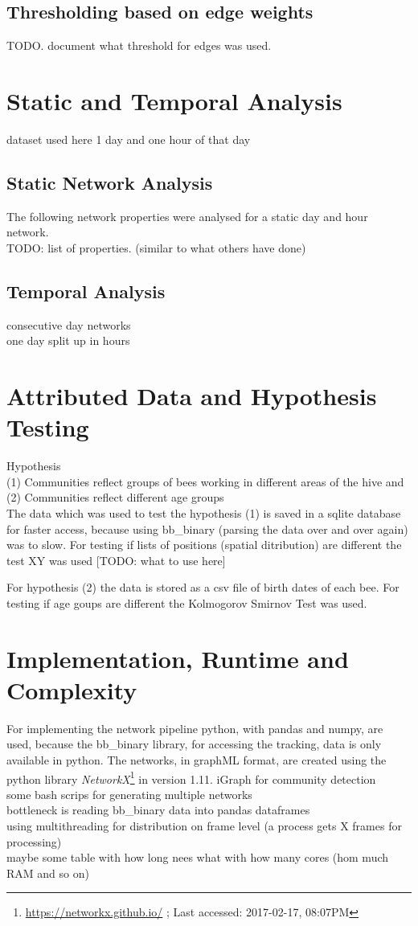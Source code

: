 \subsection{Thresholding based on edge weights}
TODO. document what threshold for edges was used.

\section{Static and Temporal Analysis}
dataset used here 1 day and one hour of that day\\

\subsection{Static Network Analysis}
The following network properties were analysed for a static day and hour network.\\
TODO: list of properties. (similar to what others have done)

\subsection{Temporal Analysis}
consecutive day networks\\
one day split up in hours\\

\section{Attributed Data and Hypothesis Testing}
Hypothesis\\
(1) Communities reflect groups of bees working in different areas of the hive and\\
(2) Communities reflect different age groups\\

The data which was used to test the hypothesis (1) is saved in a sqlite database for faster access, because using bb\_binary (parsing the data over and over again) was to slow. For testing if lists of positions (spatial ditribution) are different the test XY was used [TODO: what to use here]

For hypothesis (2) the data is stored as a csv file of birth dates of each bee. For testing if age goups are different the Kolmogorov Smirnov Test was used.

\section{Implementation, Runtime and Complexity}
For implementing the network pipeline python, with pandas and numpy, are used, because the bb\_binary library, for accessing the tracking, data is only available in python. The networks, in graphML format, are created using the python library \emph{NetworkX}\footnote{\url{https://networkx.github.io/} ; Last accessed: 2017-02-17, 08:07PM} in version 1.11.
iGraph for community detection\\
some bash scrips for generating multiple networks\\

bottleneck is reading bb\_binary data into pandas dataframes\\
using multithreading for distribution on frame level (a process gets X frames for processing)\\

maybe some table with how long nees what with how many cores (hom much RAM and so on)\\